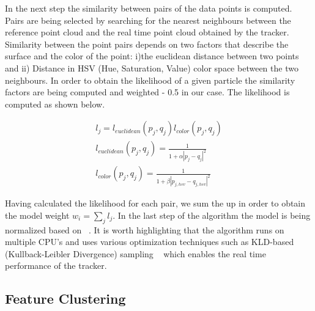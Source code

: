 In the next step the similarity between pairs of the data points is computed. Pairs are being selected by searching for the nearest neighbours between the reference point cloud and the real time point cloud obtained by the tracker. Similarity between the point pairs depends on two factors that describe the surface and the color of the point: i)the euclidean distance between two points and ii) Distance in HSV (Hue, Saturation, Value) color space between the two neighbours. In order to obtain the likelihood of a given particle the similarity factors are being computed and weighted - 0.5 in our case. The likelihood is computed as shown below.

\begin{eqnarray}
  l_{j} = l_{euclidean}(p_{j},q_{j})l_{color}(p_{j},q_{j}) \nonumber \\
  l_{euclidean}(p_{j},q_{j}) = \frac{1}{1+\alpha|p_{j}-q_{j}|^2} \nonumber \\
  l_{color}(p_{j},q_{j}) = \frac{1}{1+\beta|p_{j,hsv}-q_{j,hsv}|^2} 
  \label{eq:likelihood}
\end{eqnarray} 

Having calculated the likelihood for each pair, we sum the up in order to obtain the model weight $w_{i} = \sum\limits_{j}l_{j}$. In the last step of the algorithm the model is being normalized based on ~\cite{AzadMAD11}. It is worth highlighting that the algorithm runs on multiple CPU's and uses various optimization techniques such as KLD-based 
(Kullback-Leibler Divergence) sampling ~\cite{Fox01KLD} which enables the real time performance of the tracker.


\subsection{Feature Clustering}

\label{sec:clustering}

